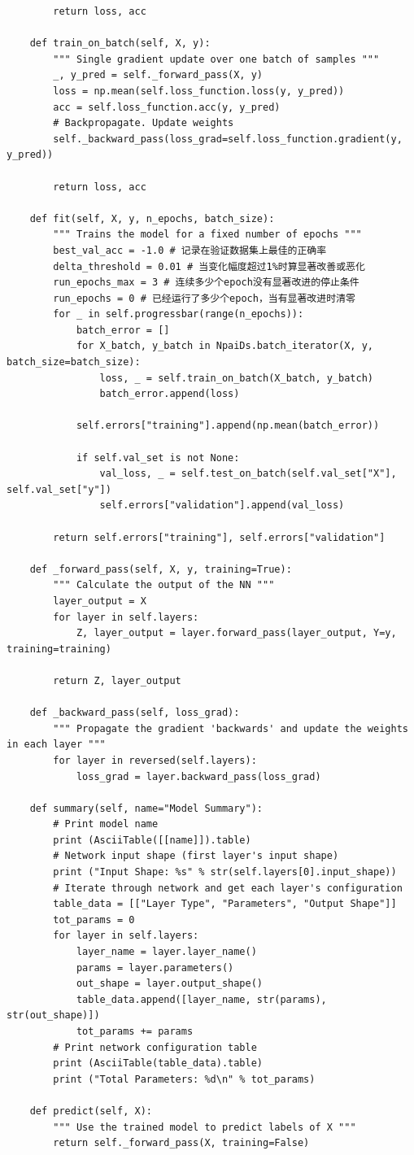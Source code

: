 \documentclass[UTF8]{article}
\begin{document}
\begin{lstlisting}
        return loss, acc

    def train_on_batch(self, X, y):
        """ Single gradient update over one batch of samples """
        _, y_pred = self._forward_pass(X, y)
        loss = np.mean(self.loss_function.loss(y, y_pred))
        acc = self.loss_function.acc(y, y_pred)
        # Backpropagate. Update weights
        self._backward_pass(loss_grad=self.loss_function.gradient(y, y_pred))

        return loss, acc

    def fit(self, X, y, n_epochs, batch_size):
        """ Trains the model for a fixed number of epochs """
        best_val_acc = -1.0 # 记录在验证数据集上最佳的正确率
        delta_threshold = 0.01 # 当变化幅度超过1%时算显著改善或恶化
        run_epochs_max = 3 # 连续多少个epoch没有显著改进的停止条件
        run_epochs = 0 # 已经运行了多少个epoch，当有显著改进时清零
        for _ in self.progressbar(range(n_epochs)):
            batch_error = []
            for X_batch, y_batch in NpaiDs.batch_iterator(X, y, batch_size=batch_size):
                loss, _ = self.train_on_batch(X_batch, y_batch)
                batch_error.append(loss)

            self.errors["training"].append(np.mean(batch_error))

            if self.val_set is not None:
                val_loss, _ = self.test_on_batch(self.val_set["X"], self.val_set["y"])
                self.errors["validation"].append(val_loss)

        return self.errors["training"], self.errors["validation"]

    def _forward_pass(self, X, y, training=True):
        """ Calculate the output of the NN """
        layer_output = X
        for layer in self.layers:
            Z, layer_output = layer.forward_pass(layer_output, Y=y, training=training)

        return Z, layer_output

    def _backward_pass(self, loss_grad):
        """ Propagate the gradient 'backwards' and update the weights in each layer """
        for layer in reversed(self.layers):
            loss_grad = layer.backward_pass(loss_grad)

    def summary(self, name="Model Summary"):
        # Print model name
        print (AsciiTable([[name]]).table)
        # Network input shape (first layer's input shape)
        print ("Input Shape: %s" % str(self.layers[0].input_shape))
        # Iterate through network and get each layer's configuration
        table_data = [["Layer Type", "Parameters", "Output Shape"]]
        tot_params = 0
        for layer in self.layers:
            layer_name = layer.layer_name()
            params = layer.parameters()
            out_shape = layer.output_shape()
            table_data.append([layer_name, str(params), str(out_shape)])
            tot_params += params
        # Print network configuration table
        print (AsciiTable(table_data).table)
        print ("Total Parameters: %d\n" % tot_params)

    def predict(self, X):
        """ Use the trained model to predict labels of X """
        return self._forward_pass(X, training=False)
\end{lstlisting}
\end{document}
